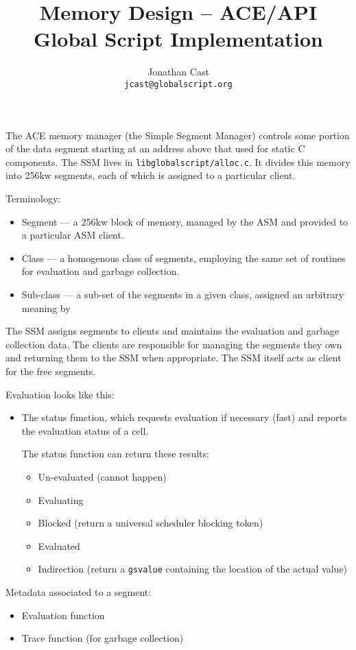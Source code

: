 \documentclass{article}
\title{Memory Design -- ACE/API Global Script Implementation}
\author{Jonathan Cast\\\texttt{jcast@globalscript.org}}
\newcommand\textc[1]{\texttt{#1}}
\newcommand\cfile[1]{\texttt{#1}}
\begin{document}
\maketitle

The ACE memory manager (the Simple Segment Manager) controls some portion of the data segment starting at an address above that used for static C components.
The SSM lives in \cfile{libglobalscript/alloc.c}.
It divides this memory into 256kw segments, each of which is assigned to a particular client.

Terminology:
\begin{itemize}
    \item Segment --- a 256kw block of memory, managed by the ASM and provided to a particular ASM client.
    \item Class --- a homogenous class of segments, employing the same set of routines for evaluation and garbage collection.
    \item Sub-class --- a sub-set of the segments in a given class, assigned an arbitrary meaning by 
\end{itemize}

The SSM assigns segments to clients and maintains the evaluation and garbage collection data.
The clients are responsible for managing the segments they own and returning them to the SSM when appropriate.
The SSM itself acts as client for the free segments.

Evaluation looks like this:
\begin{itemize}
    \item The status function, which requests evaluation if necessary (fast) and reports the evaluation status of a cell.

    The status function can return these results:
    \begin{itemize}
        \item Un-evaluated (cannot happen)
        \item Evaluating
        \item Blocked (return a universal scheduler blocking token)
        \item Evaluated
        \item Indirection (return a \textc{gsvalue} containing the location of the actual value)
    \end{itemize}
\end{itemize}

Metadata associated to a segment:

\begin{itemize}
    \item Evaluation function
    \item Trace function (for garbage collection)
\end{itemize}
\end{document}
